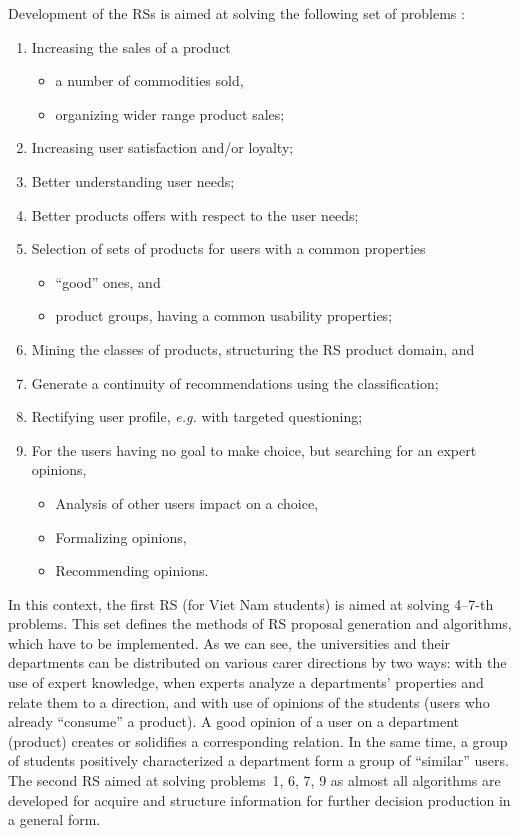 \documentclass[conference,a4]{IEEEtran}
\begin{document}
Development of the RSs is aimed at solving the following set of problems \cite{ricci}:
\begin{enumerate}
\item Increasing the sales of a product
  \begin{itemize}
  \item a number of commodities sold,
  \item organizing wider range product sales;
  \end{itemize}
\item Increasing user satisfaction and/or loyalty;
\item Better understanding user needs;
\item Better products offers with respect to the user needs;
\item Selection of sets of products for users with a common properties
  \begin{itemize}
  \item ``good'' ones, and
  \item product groups, having a common usability properties;
  \end{itemize}
\item Mining the classes of products, structuring the RS product domain, and
\item Generate a continuity of recommendations using the classification;
\item Rectifying user profile, \emph{e.g.} with targeted questioning;
\item For the users having no goal to make choice, but searching for an expert opinions,
  \begin{itemize}
  \item Analysis of other users impact on a choice,
  \item Formalizing opinions,
  \item Recommending opinions.
  \end{itemize}
\end{enumerate}
In this context, the first RS (for Viet Nam students) is aimed at solving 4--7-th problems.  This set defines the methods of RS proposal generation and algorithms, which have to be implemented.  As we can see, the universities and their departments can be distributed on various carer directions by two ways: with the use of expert knowledge, when experts analyze a departments' properties and relate them to a direction, and with use of opinions of the students (users who already ``consume'' a product).  A good opinion of a user on a department (product) creates or solidifies a corresponding relation.  In the same time, a group of students positively characterized a department form a group of ``similar'' users.  %
The second RS aimed at solving problems~1, 6, 7, 9 as almost all algorithms are developed for acquire and structure information for further decision production in a general form.
\end{document}
